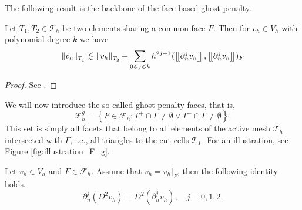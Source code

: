 The following result is the backbone of the face-based ghost penalty.
\begin{lemma}
    Let $T_{1},T_{2 } \in  \mathcal{T} _{h}$ be two elements sharing a common face $F$. Then for $v_{h} \in V_{h}$ with polynomial degree $k$  we have
    \begin{equation}
    \| v_{h} \|_{ T_{1} }^{  }  \lesssim \| v_{h} \|_{ T_{2} }^{  } + \sum_{0\leqslant j\leqslant k}  {h^{2j +1}}^{} ( \left[\!\left[  \partial _{n}^{j} v_{h}  \right]\!\right], \left[\!\left[  \partial ^{j}_{n} v_{h}  \right]\!\right]    )_{F}
    \end{equation}

\end{lemma}
\begin{proof}
    See \cite[Lemma 2.19]{gurkan2019stabilized}.
\end{proof}





We will now introduce the so-called ghost penalty faces, that is, \[
\mathcal{F} ^{g}_{h} = \left\{ F\in \mathcal{F} _{h} : T^{+}\cap \Gamma \neq \emptyset  \vee T^{-}\cap \Gamma \neq \emptyset  \right\}.
\]
This set is simply all facets that belong to all elements of the active mesh $\mathcal{T} _{h}$  intersected with $\Gamma $, i.e., all triangles to the cut cells $\mathcal{T} _{\Gamma }$. For an illustration, see Figure \ref{fig:illustration_F_g}.

\begin{proposition}
    \label{prop:hessian_change}
    Let $v_{h} \in V_{h} $ and $F \in  \mathcal{F} _{h}$. Assume that $ v_{h} = v_{h} |_{F}$,  then the following identity holds.
    \begin{equation}
    \partial ^{j}_{n} (D^2v_{h}) = D^2 ( \partial ^{j}_{n} v_{h}), \quad  j=0,1,2.
    \end{equation}
\end{proposition}

